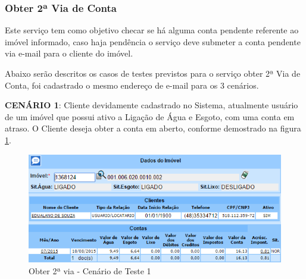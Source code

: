 \subsubsection{Obter 2ª Via de Conta}
Este serviço tem como objetivo checar se há alguma conta pendente referente ao imóvel informado, caso haja pendência o serviço deve submeter a conta pendente via e-mail para o cliente do imóvel. 

Abaixo serão descritos os casos de testes previstos para o serviço obter 2ª Via de Conta, foi cadastrado o mesmo endereço de e-mail para os 3 cenários.
\begin{flushleft}
	\begin{description}
		\item \textbf{CENÁRIO 1}: Cliente devidamente cadastrado no Sistema, atualmente usuário de um imóvel que possui ativo a Ligação de Água e Esgoto, com uma conta em atraso. O Cliente deseja obter a conta em aberto, conforme demostrado na figura \ref{figura:2ViaCenario1}.
		\begin{figure}[H]
			\centering
			\caption{Obter 2ª via - Cenário de Teste 1}
			\label{figura:2ViaCenario1}
			\includegraphics{figuras/cenarios/segunda_via/cenario_1.PNG}
		\end{figure}
	\end{description}
	

\end{flushleft}
